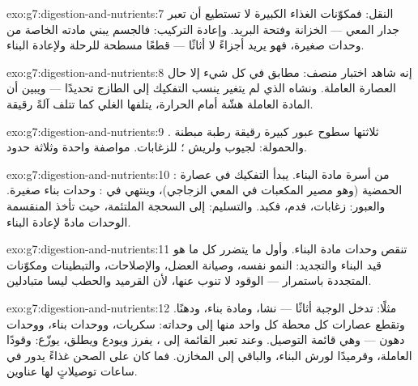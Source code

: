 \begin{solution}{exo:g7:digestion-and-nutrients:7}
النقل: فمكوّنات الغذاء الكبيرة لا تستطيع أن تعبر جدار المعي ---
الخزانة وفتحة البريد. وإعادة التركيب: فالجسم يبني مادته الخاصة من
وحدات صغيرة، فهو يريد أجزاءً لا أثاثًا --- قطعًا مسطحة للرحلة
ولإعادة البناء.
\end{solution}

\begin{solution}{exo:g7:digestion-and-nutrients:8}
إنه شاهد اختبار منصف: مطابق في كل شيء إلا حال العصارة العاملة.
ونشاه الذي لم يتغير ينسب التفكيك إلى  الطازج تحديدًا ---
ويبين أن المادة العاملة هشّة أمام الحرارة، يتلفها الغلي كما تتلف
آلةً رقيقة.
\end{solution}

\begin{solution}{exo:g7:digestion-and-nutrients:9}
ثلاثتها سطوح عبور كبيرة رقيقة رطبة مبطنة . والحمولة: 
 لجيوب  ولريش ؛ 
للزغابات. مواصفة واحدة وثلاثة حدود.
\end{solution}

\begin{solution}{exo:g7:digestion-and-nutrients:10}
: من أسرة مادة البناء. يبدأ التفكيك في عصارة  الحمضية
(وهو مصير المكعبات في المعي الزجاجي)، وينتهي في :
وحدات بناء صغيرة. والعبور: زغابات، فدم، فكبد. والتسليم: إلى السحجة
الملتئمة، حيث تأخذ   المنقسمة الوحدات مادةً لإعادة
البناء.
\end{solution}

\begin{solution}{exo:g7:digestion-and-nutrients:11}
تنقص وحدات مادة البناء. وأول ما يتضرر كل ما هو قيد البناء
والتجديد: النمو نفسه، وصيانة العضل، والإصلاحات، والتبطينات ومكوّنات
 المتجددة باستمرار ---  الوقود لا تنوب عنها، لأن
القرميد والحطب ليسا متبادلين.
\end{solution}

\begin{solution}{exo:g7:digestion-and-nutrients:12}
مثلًا: تدخل الوجبة أثاثًا --- نشا، ومادة بناء، ودهنًا. وتقطع
عصارات كل محطة كل واحد منها إلى وحداته: سكريات، ووحدات بناء،
ووحدات دهون --- وهي قائمة التوصيل. وعند  تعبر القائمة إلى
،  يفرز ويودع ويطلق،  يوزّع: وقودًا 
العاملة، وقرميدًا لورش البناء، والباقي إلى المخازن. فما كان على
الصحن غذاءً يدور في ساعات توصيلاتٍ لها عناوين.
\end{solution}

